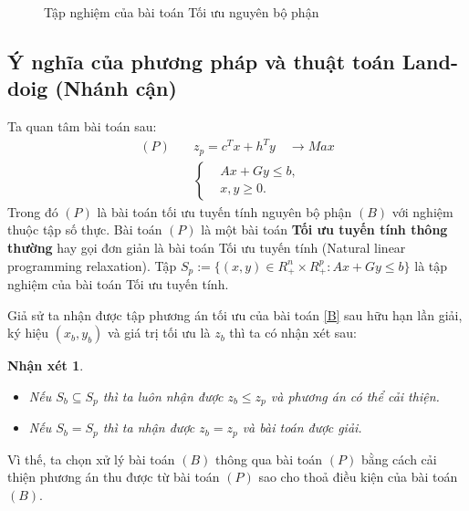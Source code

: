 \documentclass[12pt,a4paper]{report}
\newtheorem{nx}{Nhận xét}
\begin{document}
\begin{figure} \label{bophan}
\center	
{}  
\caption{Tập nghiệm của bài toán Tối ưu nguyên bộ phận}
\end{figure}

    
\subsection{Ý nghĩa của phương pháp và thuật toán Land-doig (Nhánh cận)}

Ta quan tâm bài toán sau:
\begin{equation}\label{P}
\begin{split}
(P) \quad & z_p=c^Tx+h^Ty \quad \longrightarrow Max \\
            & \left\{\begin{split}
                &Ax+Gy \leq  b, \\
                &x,y \geq 0.
            \end{split}\right.    
\end{split}
\end{equation}
Trong đó $(P)$ là bài toán tối ưu tuyến tính nguyên bộ phận $(B)$ với nghiệm thuộc tập số thực.
Bài toán $(P)$ là một bài toán \textbf{Tối ưu tuyến tính thông thường} hay gọi đơn giản là bài toán Tối ưu tuyến tính (Natural linear programming relaxation).
Tập $S_p:=\{(x,y)\in R^n_+\times R^p_+: Ax+Gy\leq b\}$ là tập nghiệm của bài toán Tối ưu tuyến tính.

Giả sử ta nhận được tập phương án tối ưu của bài toán \eqref{B} sau hữu hạn lần giải, ký hiệu $(x_b, y_b)$ và giá trị tối ưu là $z_b$ thì ta có nhận xét sau:
\begin{nx} \label{nx}
\phantom{abc}
\begin{itemize}
\item Nếu $S_b \subseteq S_p$ thì ta luôn nhận được $z_b \leq z_p$ và phương án có thể cải thiện.
\item Nếu $S_b = S_p$ thì ta nhận được $z_b = z_p$ và bài toán được giải.
\end{itemize}    
\end{nx}
Vì thế, ta chọn xử lý bài toán $(B)$ thông qua bài toán $(P)$ bằng cách cải thiện phương án thu được từ bài toán $(P)$ sao cho thoả điều kiện của bài toán $(B)$.
\end{document}
